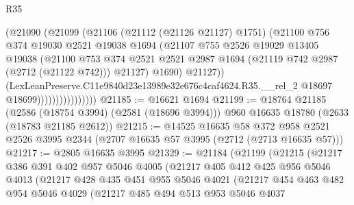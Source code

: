 \begin{lexlean}{R35}
\begin{coremodule}
                              (@21090
                                (@21099
                                  (@21106
                                    (@21112 (@21126 @21127) @1751)
                                    (@21100
                                      @756
                                      @374
                                      @19030
                                      @2521
                                      @19038
                                      @1694
                                      (@21107
                                        @755
                                        @2526
                                        @19029
                                        @13405
                                        @19038
                                        (@21100
                                          @753
                                          @374
                                          @2521
                                          @2521
                                          @2987
                                          @1694
                                          (@21119 @742 @2987 (@2712 (@21122 @742)))
                                          @21127)
                                        @1690)
                                      @21127))
                                  (LexLeanPreserve.C11e9840d23e13989e32e676c4caf4624.R35.__rel_2
                                    @18697
                                    @18699))))))))))))))))
@21185 := @16621 @1694
@21199 := @18764
    @21185
    (@2586 (@18754 @3994) (@2581 (@18696 @3994)))
    @960
    @16635
    @18780
    (@2633 (@18783 @21185 @2612))
@21215 := @14525
    @16635
    @58
    @372
    @958
    @2521
    @2526
    @3995
    @2344
    (@2707 @16635 @57 @3995 (@2712 (@2713 @16635 @57)))
@21217 := @2805 @16635 @3995
@21329 := @21184
    (@21199
      (@21215
        (@21217
          @386
          @391
          @402
          @957
          @5046
          @4005
          (@21217
            @405
            @412
            @425
            @956
            @5046
            @4013
            (@21217
              @428
              @435
              @451
              @955
              @5046
              @4021
              (@21217
                @454
                @463
                @482
                @954
                @5046
                @4029
                (@21217
                  @485
                  @494
                  @513
                  @953
                  @5046
                  @4037

\end{coremodule}
\end{lexlean}
